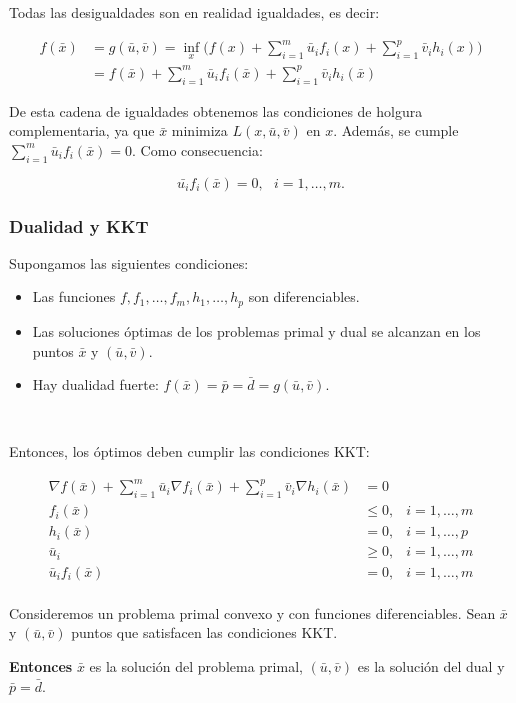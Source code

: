 Todas las desigualdades son en realidad igualdades, es decir:

\begin{align*}
f(\bar{x}) &= g(\bar{u},\bar{v}) = \inf_x \big(f(x) + \sum_{i=1}^m \bar{u}_i f_i(x) + \sum_{i=1}^p \bar{v}_i h_i(x) \big)\\
&= f(\bar{x}) + \sum_{i=1}^m \bar{u}_i f_i(\bar{x}) + \sum_{i=1}^p \bar{v}_i h_i(\bar{x}) 
\end{align*}

De esta cadena de igualdades obtenemos las condiciones de holgura complementaria, ya que $\bar{x}$ minimiza $L(x,\bar{u},\bar{v})$ en $x$.
%
Además, se cumple $\sum_{i=1}^m \bar{u}_i f_i(\bar{x})=0$.
%
Como consecuencia:

	\[
		\bar{u_i} f_i(\bar{x}) = 0, \ \ \ i=1,\ldots,m.
	\]


\subsubsection{Dualidad y KKT}

Supongamos las siguientes condiciones:

\begin{itemize}
\item Las funciones $f,f_1,\ldots, f_m,h_1,\ldots,h_p$ son diferenciables.
\item Las soluciones óptimas de los problemas primal y dual se alcanzan en los puntos
 $\bar{x}$ y $(\bar{u},\bar{v})$.
\item Hay dualidad fuerte: $f(\bar{x})=\bar{p}=\bar{d}=g(\bar{u},\bar{v})$.
\end{itemize}


\

Entonces, los óptimos deben cumplir las condiciones KKT:

\begin{align*}
\nabla f(\bar{x}) + \sum_{i=1}^m \bar{u}_i \nabla f_i(\bar{x}) + \sum_{i=1}^p \bar{v}_i\nabla h_i(\bar{x}) & = 0 \\
f_i(\bar{x}) &\leq 0, & i = 1,\ldots,m \\
h_i(\bar{x}) &= 0, & i = 1,\ldots,p \\
\bar{u}_i    & \geq 0, & i = 1,\ldots,m\\
\bar{u}_i f_i(\bar{x}) &  = 0, & i = 1,\ldots,m\\
\end{align*}



\begin{theorem}
\label{thm:convKKT}

Consideremos un problema primal convexo y con funciones diferenciables.
%
Sean $\bar{x}$ y $(\bar{u},\bar{v})$ puntos que satisfacen las condiciones KKT. 

\textbf{Entonces} $\bar{x}$ es la solución del problema primal, $(\bar{u},\bar{v})$ es la solución del dual y  $\bar{p} =  \bar{d}$.
\end{theorem}

